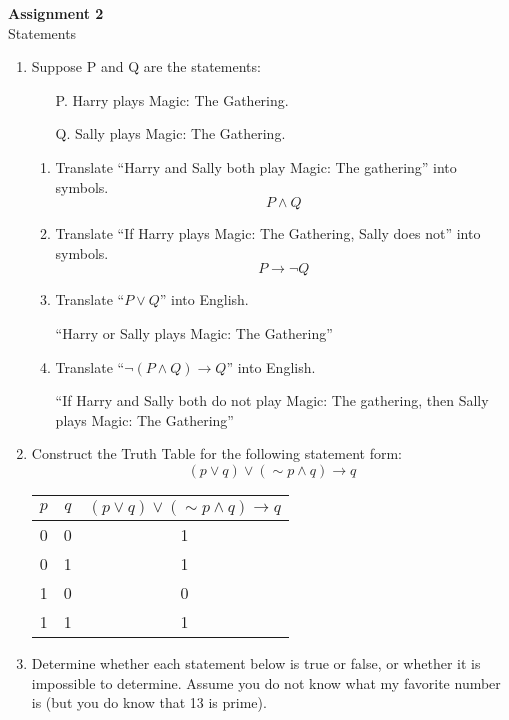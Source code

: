 \documentclass[11pt, letterpaper, includehead]{article}
\begin{document}
 

\pagestyle{fancy}
\fancyhead{}
\fancyfoot{}


\begin{center}
    \Large{\textbf{Assignment 2}}\\
    \Large{Statements}
\end{center}

\begin{enumerate}[label=\textbf{\arabic*}.]
    \item Suppose P and Q are the statements:
\begin{enumerate}
    \item[P.] Harry plays Magic: The Gathering.
    \item[Q.] Sally plays Magic: The Gathering.
\end{enumerate}

\begin{enumerate}[label= (\alph*)]
    \item Translate ``Harry and Sally both play Magic: The gathering'' into symbols.
    \[P \wedge Q\]
    \item Translate ``If Harry plays Magic: The Gathering, Sally does not'' into symbols.
    \[P \rightarrow \neg Q \]
    \item Translate ``$P \vee Q$'' into English.

    ``Harry or Sally plays Magic: The Gathering''
    \item Translate ``$\neg (P \wedge Q) \rightarrow Q$'' into English.
    
    ``If Harry and Sally both do not play Magic: The gathering, then Sally plays Magic: The Gathering''
\end{enumerate}
\item  Construct the Truth Table for the following statement form:
\[(p \vee q) \vee (\sim p \wedge q) \rightarrow q\]

\begin{table}[H]
    \centering
    \begin{tabular}{cc|c}
    $p$ & $q$ & $(p \vee q) \vee (\sim p \wedge q) \rightarrow q$ \\ \hline
    0 & 0 &  1\\
    0 & 1 &  1\\
    1 & 0 &  0\\
    1 & 1 &  1\\
    \end{tabular}
\end{table}
\item Determine whether each statement below is true or false, or whether it is impossible to determine. Assume you do not know what my favorite number is (but you do know that 13 is prime).


\end{enumerate}
\end{document}
